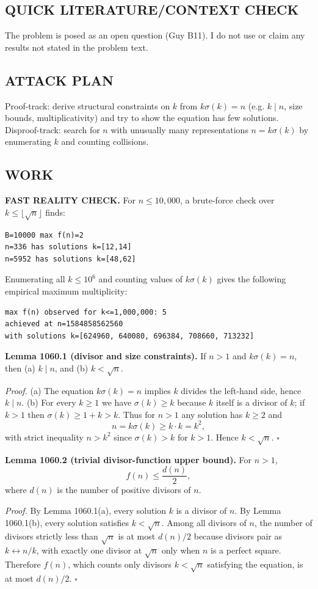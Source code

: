 \subsection*{QUICK LITERATURE/CONTEXT CHECK}
The problem is posed as an open question (Guy B11). I do not use or claim any results not stated in the problem text.

\subsection*{ATTACK PLAN}
Proof-track: derive structural constraints on $k$ from $k\sigma(k)=n$ (e.g. $k\mid n$, size bounds, multiplicativity) and try to show the equation has few solutions.
Disproof-track: search for $n$ with unusually many representations $n=k\sigma(k)$ by enumerating $k$ and counting collisions.

\subsection*{WORK}
\textbf{FAST REALITY CHECK.}
For $n\le 10{,}000$, a brute-force check over $k\le \lfloor\sqrt n\rfloor$ finds:
\begin{verbatim}
B=10000 max f(n)=2
n=336 has solutions k=[12,14]
n=5952 has solutions k=[48,62]
\end{verbatim}
Enumerating all $k\le 10^6$ and counting values of $k\sigma(k)$ gives the following empirical maximum multiplicity:
\begin{verbatim}
max f(n) observed for k<=1,000,000: 5
achieved at n=1584858562560
with solutions k=[624960, 640080, 696384, 708660, 713232]
\end{verbatim}

\medskip
\textbf{Lemma 1060.1 (divisor and size constraints).}
If $n>1$ and $k\sigma(k)=n$, then (a) $k\mid n$, and (b) $k<\sqrt n$.

\emph{Proof.}
(a) The equation $k\sigma(k)=n$ implies $k$ divides the left-hand side, hence $k\mid n$.
(b) For every $k\ge 1$ we have $\sigma(k)\ge k$ because $k$ itself is a divisor of $k$; if $k>1$ then $\sigma(k)\ge 1+k>k$.
Thus for $n>1$ any solution has $k\ge 2$ and
\[
n=k\sigma(k)\ge k\cdot k = k^2,
\]
with strict inequality $n>k^2$ since $\sigma(k)>k$ for $k>1$. Hence $k<\sqrt n$. \hfill$\square$

\medskip
\textbf{Lemma 1060.2 (trivial divisor-function upper bound).}
For $n>1$,
\[
f(n)\le \frac{d(n)}{2},
\]
where $d(n)$ is the number of positive divisors of $n$.

\emph{Proof.}
By Lemma 1060.1(a), every solution $k$ is a divisor of $n$. By Lemma 1060.1(b), every solution satisfies $k<\sqrt n$.
Among all divisors of $n$, the number of divisors strictly less than $\sqrt n$ is at most $d(n)/2$ because divisors pair as $k\leftrightarrow n/k$, with exactly one divisor at $\sqrt n$ only when $n$ is a perfect square.
Therefore $f(n)$, which counts only divisors $k<\sqrt n$ satisfying the equation, is at most $d(n)/2$. \hfill$\square$

